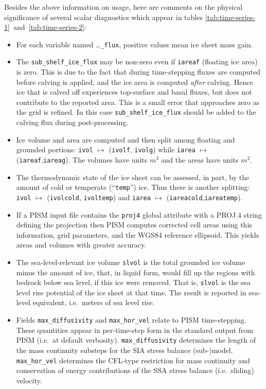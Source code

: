 Besides the above information on usage, here are comments on the physical significance of several scalar diagnostics which appear in tables \ref{tab:time-series-1}~and~\ref{tab:time-series-2}:
\begin{itemize}
  \item For each variable named \dots\texttt{_flux}, positive values mean ice sheet mass gain.
  \item The \texttt{sub_shelf_ice_flux} may be non-zero even if \texttt{iareaf} (floating ice area) is zero. This is due to the fact that during time-stepping fluxes are computed before calving is applied, and the ice area is computed \emph{after} calving. Hence ice that is calved off experiences top-surface and basal fluxes, but does not contribute to the reported area. This is a small error that approaches zero as the grid is refined. In this case \texttt{sub_shelf_ice_flux} should be added to the calving flux during post-processing.
  \item Ice volume and area are computed and then split among floating and grounded portions: \texttt{ivol} $\mapsto$ (\texttt{ivolf}, \texttt{ivolg}) while \texttt{iarea} $\mapsto$ (\texttt{iareaf},\texttt{iareag}).  The volumes have units \textsl{$m^3$} and the areas have units \textsl{$m^2$}.
  \item The thermodynamic state of the ice sheet can be assessed, in part, by the amount of cold or temperate (``\texttt{temp}'') ice.  Thus there is another splitting: \texttt{ivol} $\mapsto$ (\texttt{ivolcold}, \texttt{ivoltemp}) and \texttt{iarea} $\mapsto$ (\texttt{iareacold},\texttt{iareatemp}).
  \item If a PISM input file contains the \texttt{proj4} global attribute with a PROJ.4 string defining the projection then PISM computes corrected cell areas
using this information, grid parameters, and the WGS84 reference ellipsoid. This yields areas and volumes with greater accuracy.
  \item The sea-level-relevant ice volume \texttt{slvol} is the total grounded ice volume minus the amount of ice, that, in liquid form, would fill up the regions with bedrock below sea level, if this ice were removed.  That is, \texttt{slvol} is the sea level rise potential of the ice sheet at that time.  The result is reported  in sea-level equivalent, i.e.~meters of sea level rise.
  \item Fields \texttt{max_diffusivity} and \texttt{max_hor_vel} relate to PISM time-stepping.  These quantities appear in per-time-step form in the standard output from PISM (i.e.~at default verbosity).  \texttt{max_diffusivity} determines the length of the mass continuity substeps for the SIA stress balance (sub-)model.  \texttt{max_hor_vel} determines the CFL-type restriction for mass continuity and conservation of energy contributions of the SSA stress balance (i.e.~sliding) velocity.
\end{itemize}

